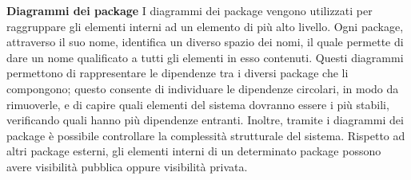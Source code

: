 						\textbf{Diagrammi dei package}
						\newline
						\newline
						\hangindent=0.6cm I diagrammi dei package vengono utilizzati per raggruppare gli elementi interni ad un elemento di più alto livello. Ogni package, attraverso il suo nome, identifica un diverso spazio dei nomi, il quale permette di dare un nome qualificato a tutti gli elementi in esso contenuti.
						\newline
						\hangindent=0.6cm Questi diagrammi permettono di rappresentare le dipendenze tra i diversi package che li compongono; questo consente di individuare le dipendenze circolari, in modo da rimuoverle, e di capire quali elementi del sistema dovranno essere i più stabili, verificando quali hanno più dipendenze entranti. Inoltre, tramite i diagrammi dei package è possibile controllare la complessità strutturale del sistema.
						\newline
						\hangindent=0.6cm Rispetto ad altri package esterni, gli elementi interni di un determinato package possono avere visibilità pubblica oppure visibilità privata.
						
